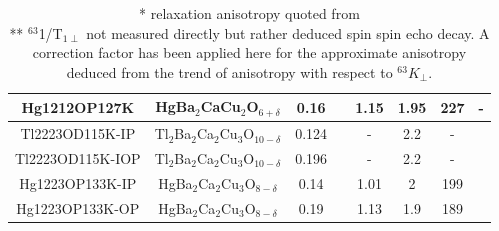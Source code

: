 \documentclass[preprint,superscriptaddress,amsmath,amssymb,aps,physrev,prb,floatfix, fleqn]{revtex4-2} \usepackage{bm} %
\begin{document}
\begin{table}[h]
\begin{tabular}{|c|c|c|c|c|c|c|c|}
\hline
Hg1212OP127K & HgBa$_2$CaCu$_2$O$_{6+\delta}$ & 0.16 & \cite{Itoh2017}&1.15 & 1.95 &227& -\\
\hline
Tl2223OD115K-IP & Tl$_2$Ba$_2$Ca$_2$Cu$_3$O$_{10-\delta}$ & 0.124 & \cite{Zheng1996} &-& 2.2&- &  \cite{Zheng1996}\\
\hline
Tl2223OD115K-IOP & Tl$_2$Ba$_2$Ca$_2$Cu$_3$O$_{10-\delta}$ & 0.196 & \cite{Zheng1996}&- &  2.2 &-& \cite{Zheng1996}\\
\hline
Hg1223OP133K-IP & HgBa$_2$Ca$_2$Cu$_3$O$_{8-\delta}$ & 0.14 &  \cite{Magishi1995}&1.01 & 2 &199& \cite{Magishi1995}\\
\hline
Hg1223OP133K-OP & HgBa$_2$Ca$_2$Cu$_3$O$_{8-\delta}$ & 0.19 &  \cite{Magishi1995} &1.13 & 1.9 &189& \cite{Magishi1995}\\
\hline

\end{tabular}
\caption{* relaxation anisotropy quoted from \cite{Kambe1993}\\
** $^{63}$1/T$_{1\perp}$ not measured directly but rather deduced spin spin echo decay. A correction factor has been applied here for the approximate anisotropy deduced from the trend of anisotropy with respect to $^{63}K_\perp$.}
\label{table:table1}
\end{table}
\end{document}
